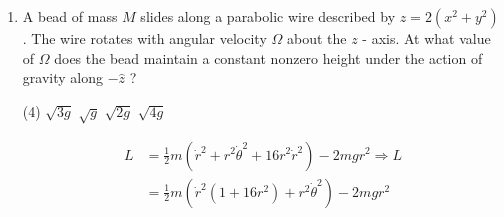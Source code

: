 \begin{enumerate}
	\begin{tasks}(4)
		\task[\textbf{A.}] $\tan \theta=\frac{\pi g}{\omega^{2} a}$
		\task[\textbf{B.}] $\sin \theta=\frac{g}{\omega^{2} a}$
		\task[\textbf{C.}] $\cos \theta=\frac{g}{\omega^{2} a}$
		\task[\textbf{D.}] $\tan \theta=\frac{g}{\pi \omega^{2} a}$
	\end{tasks}
\begin{answer}
	\begin{align*}
	\text{The Lagrangian of the system is}\\
	L&=\frac{1}{2} m a^{2}\left(\dot{\theta}^{2}+\sin ^{2} \theta \dot{\phi}^{2}\right)+m g a \cos \theta\\
	\text{The equation of motion is,}\\
	&\frac{d}{d t}\left(\frac{\partial L}{\partial \dot{\theta}}\right)-\left(\frac{\partial L}{\partial \theta}\right)\\&=0 \Rightarrow m a^{2} \ddot{\theta}-m a^{2}\left(\sin \theta \cos \theta \dot{\phi}^{2}\right)+m g a \sin \theta=0\\
	\text{When bead is stationary, then}\\
	\frac{d \theta}{d t}&=\frac{d^{2} \theta}{d t^{2}}\\&=0 \Rightarrow-m a^{2}\left(\sin \theta \cos \theta \dot{\phi}^{2}\right)+m g a \sin \theta=0\\
	\Rightarrow \dot{\phi}&=\omega\text{ and }g<\omega^{2} a,\text{ then }\cos \theta=\frac{g}{\omega^{2} a}
	\end{align*}
	So the correct answer is \textbf{Option (C)}
\end{answer}
	\item A bead of mass $M$ slides along a parabolic wire described by $z=2\left(x^{2}+y^{2}\right)$. The wire rotates with angular velocity $\Omega$ about the $z$ - axis. At what value of $\Omega$ does the bead maintain a constant nonzero height under the action of gravity along $-\hat{z}$ ?
	{}
	\begin{tasks}(4)
		\task[\textbf{A.}] $\sqrt{3 g}$
		\task[\textbf{B.}] $\sqrt{g}$
		\task[\textbf{C.}] $\sqrt{2 g}$
		\task[\textbf{D.}] $\sqrt{4 g}$
	\end{tasks}
\begin{answer}
	\begin{align*}
	L&=\frac{1}{2} m\left(\dot{r}^{2}+r^{2} \dot{\theta}^{2}+16 r^{2} \dot{r}^{2}\right)-2 m g r^{2} \Rightarrow L\\&=\frac{1}{2} m\left(\dot{r}^{2}\left(1+16 r^{2}\right)+r^{2} \dot{\theta}^{2}\right)-2 m g r^{2}

\end{align*}
\end{answer}
\end{enumerate}
